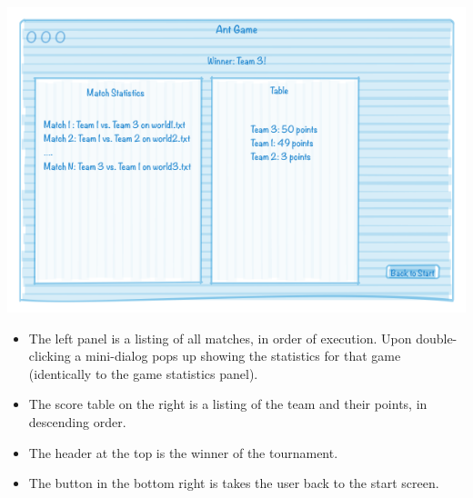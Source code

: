 \documentclass[11pt]{article}
\begin{document}
\begin{center}
\includegraphics[width=\textwidth]{low-level-diagrams/interface/tournament-statistics-screen}
\end{center}

\begin{itemize}
\item The left panel is a listing of all matches, in order of execution. Upon double-clicking a mini-dialog pops up showing the statistics for that game (identically to the game statistics panel).
\item The score table on the right is a listing of the team and their points, in descending order.
\item The header at the top is the winner of the tournament.
\item The button in the bottom right is takes the user back to the start screen.
\end{itemize}
\end{document}
